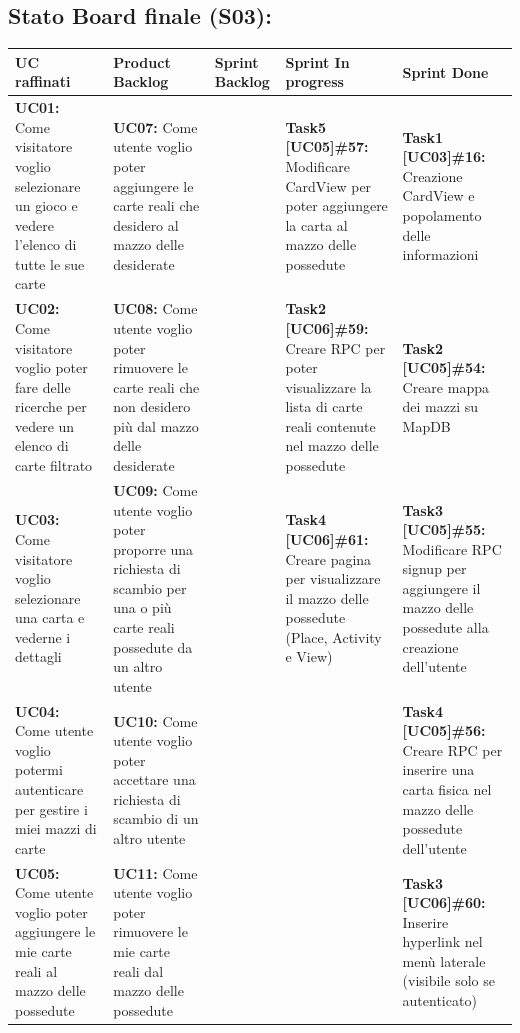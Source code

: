 \documentclass[a4paper, oneside]{article}
\begin{document}
\begin{landscape}
        \subsection{Stato Board finale (S03):}
        \small
        \def\arraystretch{2}%
        \begin{tabular}{ | p{4.5cm} | p{4.3cm} | p{3.7cm} | p{5cm} | p{5.5cm}| }
            \hline
            \textbf{UC raffinati}
            & \textbf{Product Backlog}
            & \textbf{Sprint Backlog}
            & \textbf{Sprint In progress}
            & \textbf{Sprint Done} \\
            \hline
            \hline
            \textbf{UC01:} Come visitatore voglio selezionare un gioco e vedere l'elenco di tutte le sue carte & \textbf{UC07:} Come utente voglio poter aggiungere le carte reali che desidero al mazzo delle desiderate & & \textbf{Task5 [UC05]\#57:} Modificare CardView per poter aggiungere la carta al mazzo delle possedute &
            \textbf{Task1 [UC03]\#16:} Creazione CardView e popolamento delle informazioni \\
            \hline
            \textbf{UC02:} Come visitatore voglio poter fare delle ricerche per vedere un elenco di carte filtrato &  \textbf{UC08:} Come utente voglio poter rimuovere le carte reali che non desidero più dal mazzo delle desiderate & & \textbf{Task2 [UC06]\#59:} Creare RPC per poter visualizzare la lista di carte reali contenute nel mazzo delle possedute  & \textbf{Task2 [UC05]\#54:} Creare mappa dei mazzi su MapDB \\
            \hline
            \textbf{UC03:} Come visitatore voglio selezionare una carta e vederne i dettagli  & \textbf{UC09:} Come utente voglio poter proporre una richiesta di scambio per una o più carte reali possedute da un altro utente & & \textbf{Task4 [UC06]\#61:} Creare pagina per visualizzare il mazzo delle possedute (Place, Activity e View) & \textbf{Task3 [UC05]\#55:} Modificare RPC signup per aggiungere il mazzo delle possedute alla creazione dell'utente \\
            \hline
            \textbf{UC04:}  Come utente voglio potermi autenticare per gestire i miei mazzi di carte & \textbf{UC10:} Come utente voglio poter accettare una richiesta di scambio di un altro utente & & & \textbf{Task4 [UC05]\#56:} Creare RPC per inserire una carta fisica nel mazzo delle possedute dell'utente \\
            \hline
            \textbf{UC05:} Come utente voglio poter aggiungere le mie carte reali al mazzo delle possedute & \textbf{UC11:} Come utente voglio poter rimuovere le mie carte reali dal mazzo delle possedute & & &  \textbf{Task3 [UC06]\#60:} Inserire hyperlink nel menù laterale (visibile solo se autenticato)  \\

\end{tabular}
\end{landscape}
\end{document}
